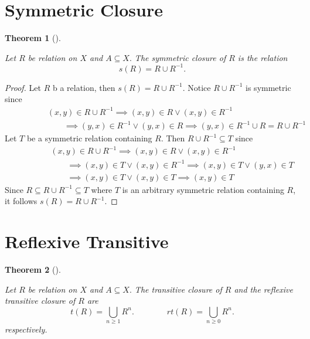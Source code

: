 \documentclass[
  letterpaper,
  10pt,
  reqno,
  twopage,
  openany]{book}
\theoremstyle{plain}
\theoremstyle{definition}
\theoremstyle{definition}
\theoremstyle{definition}
\theoremstyle{plain}
\theoremstyle{plain}
\newtheorem{theorem}{Theorem}[chapter]
\theoremstyle{remark}
\begin{document}
\hypertarget{symmetric-closure}{%
\section{Symmetric Closure}\label{symmetric-closure}}

\leavevmode{}%
\begin{theorem}[]\label{thm-symmetric-closure}

Let \(R\) be relation on \(X\) and \(A\subseteq X.\) The symmetric
closure of \(R\) is the relation \[
s(R)=R \cup R^{-1}.
\]

\end{theorem}

\begin{proof}

Let \(R\) b a relation, then \(s(R)=R\cup R^{-1}.\) Notice
\(R\cup R^{-1}\) is symmetric since \begin{align*}
\qquad \qquad & (x,y) \in R\cup R^{-1} 
\implies  (x,y)\in R \lor (x,y)\in R^{-1}
\\ & \qquad 
\implies  (y,x)\in R^{-1} \lor (y,x)\in R 
\implies  (y,x)\in R^{-1} \cup R=R\cup R^{-1}
\end{align*} Let \(T\) be a symmetric relation containing \(R.\) Then
\(R\cup R^{-1}\subseteq T\) since \begin{align*}
\qquad \qquad & (x,y) \in R\cup R^{-1} 
\implies (x,y)\in R \lor (x,y)\in R^{-1} 
\\ & \qquad 
\implies (x,y)\in T \lor (x,y)\in R^{-1} 
\implies (x,y)\in T \lor (y,x)\in T 
\\ & \qquad 
\implies (x,y)\in T \lor (x,y)\in T
\implies (x,y)\in T
\end{align*} Since \(R\subseteq R\cup R^{-1} \subseteq T\) where \(T\)
is an arbitrary symmetric relation containing \(R\), it follows
\(s(R)=R\cup R^{-1}.\)

\end{proof}

\hypertarget{reflexive-transitive}{%
\section{Reflexive Transitive}\label{reflexive-transitive}}

\leavevmode{}%
\begin{theorem}[]\label{thm-reflexive-transitive-closure}

Let \(R\) be relation on \(X\) and \(A\subseteq X.\) The transitive
closure of \(R\) and the reflexive transitive closure of \(R\) are \[
t(R)=\bigcup_{n\geq 1} R^n.
\qquad \qquad
rt(R)=\bigcup_{n\geq 0} R^n.
\] respectively.

\end{theorem}
\end{document}
